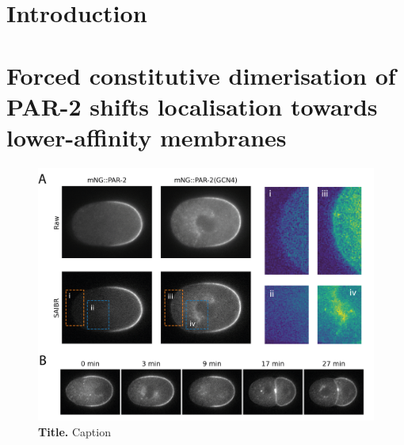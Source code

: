 \documentclass[12pt]{"report"}
\newcommand{\mycaption}[2]{\caption[#1]{\textbf{#1.} #2}}
\begin{document}
\clearpage
\section{Introduction}

\section{Forced constitutive dimerisation of PAR-2 shifts localisation towards lower-affinity membranes}



\begin{figure}[!h]
\includegraphics[scale=1]{gcn4}
\setlength{\abovecaptionskip}{20pt}
\centering
\mycaption{Title}{Caption}
\label{fig:gcn4}
\end{figure}
\end{document}
